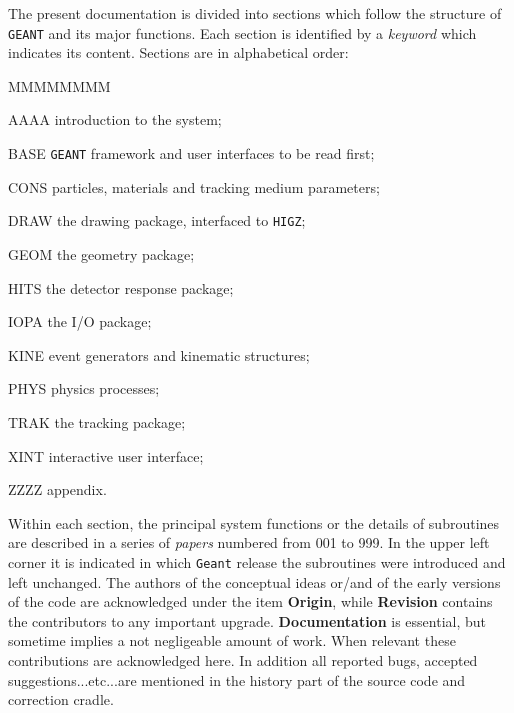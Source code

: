        
The present documentation is divided into
sections which follow the structure of
{\tt GEANT} and its major functions. Each section is identified by a
{\it keyword} which indicates its content. Sections are in alphabetical
order:

\begin{DLtt}{MMMMMMMM}
\item[AAAA]       introduction to the system;
\item[BASE]       {\tt GEANT} framework and user interfaces to be read first;
\item[CONS]       particles, materials and tracking medium parameters;
\item[DRAW]       the drawing package, interfaced to {\tt HIGZ};
\item[GEOM]       the geometry package;
\item[HITS]       the detector response package;
\item[IOPA]       the I/O package;
\item[KINE]       event generators and kinematic structures;
\item[PHYS]       physics processes;
\item[TRAK]       the tracking package;
\item[XINT]       interactive user interface;
\item[ZZZZ]       appendix.
\end{DLtt}

Within each section, the principal system functions or the details of
subroutines are described in a series of {\it papers} numbered from 001 to 999.
In the upper left corner it is indicated in which {\tt Geant} release 
the subroutines
were introduced and left unchanged.
The authors of the conceptual ideas or/and of the early versions of the
code are acknowledged under the item {\bf Origin}, while {\bf Revision}
contains the contributors to any important upgrade. {\bf Documentation}
is essential, but sometime implies a not negligeable amount of work. When
relevant these contributions are acknowledged here. 
In addition all reported bugs, accepted suggestions...etc...are mentioned in
the history part of the source code and correction cradle.

